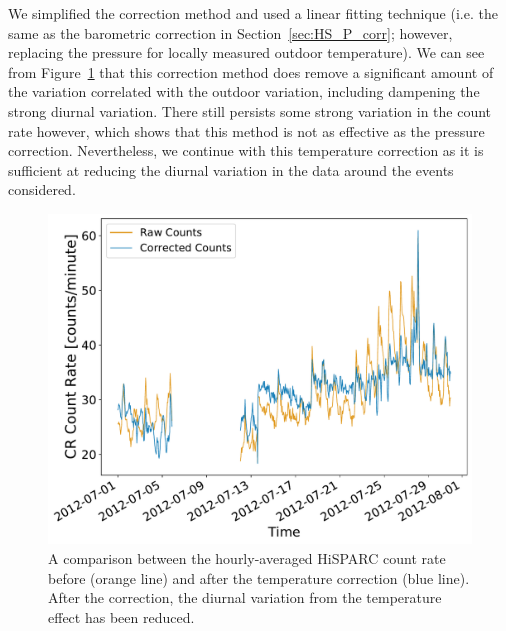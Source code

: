 We simplified the correction method and used a linear fitting technique (i.e. the same as the barometric correction in Section~\ref{sec:HS_P_corr}; however, replacing the pressure for locally measured outdoor temperature). We can see from Figure~\ref{fig:HS_T_corr} that this correction method does remove a significant amount of the variation correlated with the outdoor variation, including dampening the strong diurnal variation. There still persists some strong variation in the count rate however, which shows that this method is not as effective as the pressure correction. Nevertheless, we continue with this temperature correction as it is sufficient at reducing the diurnal variation in the data around the events considered.
 
\begin{figure}[ht!]
	\centering
	\includegraphics[width=0.65\columnwidth]{8001_raw_vs_corrected.pdf}
	\caption{A comparison between the hourly-averaged HiSPARC count rate before (orange line) and after the temperature correction (blue line). After the correction, the diurnal variation from the temperature effect has been reduced.}
 	\label{fig:HS_T_corr}
\end{figure}
 

